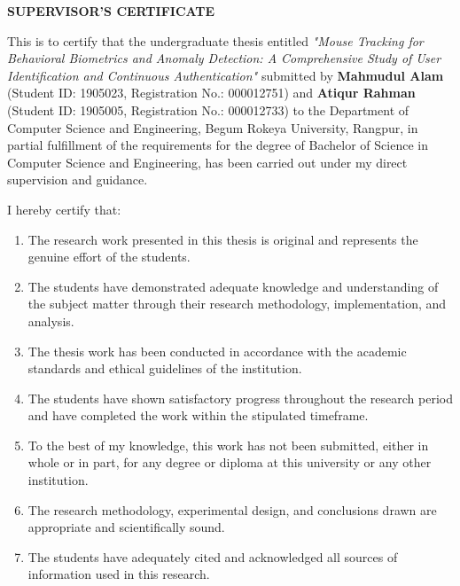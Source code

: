 \documentclass[
  12pt,
  a4paper,
]{report}
\begin{document}
\newpage

\newpage
\thispagestyle{plain}

\begin{center}
\vspace\*{2cm}
\textbf{\Large SUPERVISOR'S CERTIFICATE}
\end{center}

\vspace{2cm}

This is to certify that the undergraduate thesis entitled
\textit{"Mouse Tracking for Behavioral Biometrics and Anomaly Detection: A Comprehensive Study of User Identification and Continuous Authentication"}
submitted by \textbf{Mahmudul Alam} (Student ID: 1905023, Registration
No.: 000012751) and \textbf{Atiqur Rahman} (Student ID: 1905005,
Registration No.: 000012733) to the Department of Computer Science and
Engineering, Begum Rokeya University, Rangpur, in partial fulfillment of
the requirements for the degree of Bachelor of Science in Computer
Science and Engineering, has been carried out under my direct
supervision and guidance.

I hereby certify that:

\begin{enumerate}
\item The research work presented in this thesis is original and represents the genuine effort of the students.

\item The students have demonstrated adequate knowledge and understanding of the subject matter through their research methodology, implementation, and analysis.

\item The thesis work has been conducted in accordance with the academic standards and ethical guidelines of the institution.

\item The students have shown satisfactory progress throughout the research period and have completed the work within the stipulated timeframe.

\item To the best of my knowledge, this work has not been submitted, either in whole or in part, for any degree or diploma at this university or any other institution.

\item The research methodology, experimental design, and conclusions drawn are appropriate and scientifically sound.

\item The students have adequately cited and acknowledged all sources of information used in this research.
\end{enumerate}
\end{document}

